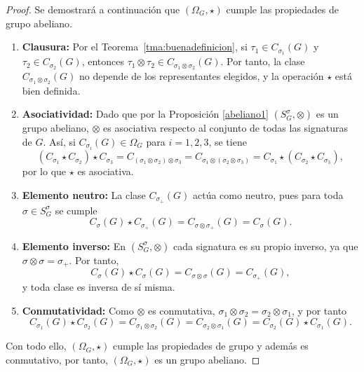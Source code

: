 \documentclass[11pt,a4paper,spanish]{report}
\theoremstyle{plain}
\begin{document}
\begin{proof}
Se demostrará a continuación que $(\Omega_G,\star)$ cumple las propiedades de grupo abeliano.

\begin{enumerate}
  

\item \textbf{Clausura:} 
Por el Teorema~\ref{tma:buenadefinicion}, si $\tau_1 \in C_{\sigma_1}(G)$ y $\tau_2 \in C_{\sigma_2}(G)$, entonces 
$\tau_1 \otimes \tau_2 \in C_{\sigma_1 \otimes \sigma_2}(G)$.
Por tanto, la clase $C_{\sigma_1 \otimes \sigma_2}(G)$ no depende de los representantes elegidos, 
y la operación $\star$ está bien definida.


\item\textbf{Asociatividad:} 
Dado que por la Proposición \ref{abeliano1} $(S^{\sigma}_G,\otimes)$ es un grupo abeliano,
$\otimes$ es asociativa respecto al conjunto de todas las signaturas de $G$. 
Así, si $C_{\sigma_i}(G)\in\Omega_G$ para $i=1,2,3$, se tiene
\[
(C_{\sigma_1}\star C_{\sigma_2})\star C_{\sigma_3}
= C_{(\sigma_1\otimes\sigma_2)\otimes\sigma_3}
= C_{\sigma_1\otimes(\sigma_2\otimes\sigma_3)}
= C_{\sigma_1}\star (C_{\sigma_2}\star C_{\sigma_3}),
\]
por lo que $\star$ es asociativa.


\item\textbf{Elemento neutro:}
La clase $C_{\sigma_+}(G)$ actúa como neutro, pues para toda $\sigma\in S^{\sigma}_G$ se cumple
\[
C_{\sigma}(G)\star C_{\sigma_+}(G)
= C_{\sigma\otimes\sigma_+}(G)
= C_{\sigma}(G).
\]


\item\textbf{Elemento inverso:}
En $(S^{\sigma}_G,\otimes)$ cada signatura es su propio inverso, 
ya que $\sigma\otimes\sigma=\sigma_+$. 
Por tanto,
\[
C_{\sigma}(G)\star C_{\sigma}(G)
= C_{\sigma\otimes\sigma}(G)
= C_{\sigma_+}(G),
\]
y toda clase es inversa de sí misma.


\item\textbf{Conmutatividad:}
Como $\otimes$ es conmutativa, 
$\sigma_1\otimes\sigma_2=\sigma_2\otimes\sigma_1$, 
y por tanto
\[
C_{\sigma_1}(G)\star C_{\sigma_2}(G)
= C_{\sigma_1\otimes\sigma_2}(G)
= C_{\sigma_2\otimes\sigma_1}(G)
= C_{\sigma_2}(G)\star C_{\sigma_1}(G).
\]
\end{enumerate}

Con todo ello, $(\Omega_G,\star)$ cumple las propiedades de grupo y además es conmutativo, por tanto, $(\Omega_G,\star)$ es un grupo abeliano.
\end{proof}
\end{document}
